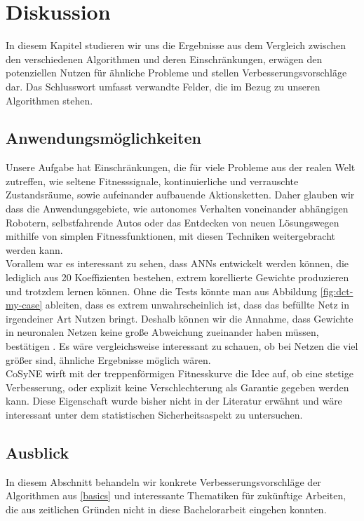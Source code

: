 \chapter{Diskussion}
    In diesem Kapitel studieren wir uns die Ergebnisse aus dem Vergleich zwischen den verschiedenen Algorithmen und deren Einschränkungen, erwägen den potenziellen Nutzen für ähnliche Probleme und stellen Verbesserungsvorschläge dar. Das Schlusswort umfasst verwandte Felder, die im Bezug zu unseren Algorithmen stehen.
    \section{Anwendungsmöglichkeiten}
        Unsere Aufgabe hat Einschränkungen, die für viele Probleme aus der realen Welt zutreffen, wie seltene Fitnesssignale, kontinuierliche und verrauschte Zustandsräume, sowie aufeinander aufbauende Aktionsketten. Daher glauben wir dass die Anwendungsgebiete, wie autonomes Verhalten voneinander abhängigen Robotern, selbstfahrende Autos oder das Entdecken von neuen Lösungswegen mithilfe von simplen Fitnessfunktionen, mit diesen Techniken weitergebracht werden kann. \\

        \noindent
        Vorallem war es interessant zu sehen, dass ANNs entwickelt werden können, die lediglich aus 20 Koeffizienten bestehen, extrem korellierte Gewichte produzieren und trotzdem lernen können. Ohne die Tests könnte man aus Abbildung \ref{fig:dct-my-case} ableiten, dass es extrem unwahrscheinlich ist, dass das befüllte Netz in irgendeiner Art Nutzen bringt. Deshalb können wir die Annahme, dass Gewichte in neuronalen Netzen keine große Abweichung zueinander haben müssen, bestätigen \cite{cosyne1}. Es wäre vergleichsweise interessant zu schauen, ob bei Netzen die viel größer sind, ähnliche Ergebnisse möglich wären. \\

        \noindent
        CoSyNE wirft mit der treppenförmigen Fitnesskurve die Idee auf, ob eine stetige Verbesserung, oder explizit keine Verschlechterung als Garantie gegeben werden kann. Diese Eigenschaft wurde bisher nicht in der Literatur \cite{cosyne1}\cite{cosyne2}\cite{cosyne3} erwähnt und wäre interessant unter dem statistischen Sicherheitsaspekt zu untersuchen.

\newpage

    \section{Ausblick} \label{ausblick}
        In diesem Abschnitt behandeln wir konkrete Verbesserungsvorschläge der Algorithmen aus \ref{basics} und interessante Thematiken für zukünftige Arbeiten, die aus zeitlichen Gründen nicht in diese Bachelorarbeit eingehen konnten.

